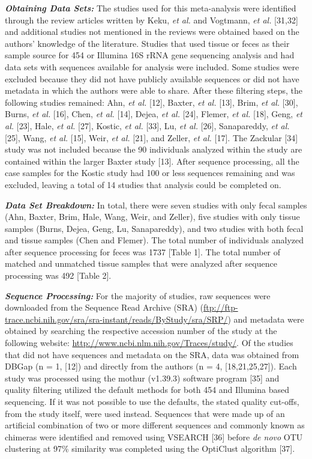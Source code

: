 \documentclass[12pt,]{article}
\begin{document}
\textbf{\emph{Obtaining Data Sets:}} The studies used for this
meta-analysis were identified through the review articles written by
Keku, \emph{et al.} and Vogtmann, \emph{et al.} {[}31,32{]} and
additional studies not mentioned in the reviews were obtained based on
the authors' knowledge of the literature. Studies that used tissue or
feces as their sample source for 454 or Illumina 16S rRNA gene
sequencing analysis and had data sets with sequences available for
analysis were included. Some studies were excluded because they did not
have publicly available sequences or did not have metadata in which the
authors were able to share. After these filtering steps, the following
studies remained: Ahn, \emph{et al.} {[}12{]}, Baxter, \emph{et al.}
{[}13{]}, Brim, \emph{et al.} {[}30{]}, Burns, \emph{et al.} {[}16{]},
Chen, \emph{et al.} {[}14{]}, Dejea, \emph{et al.} {[}24{]}, Flemer,
\emph{et al.} {[}18{]}, Geng, \emph{et al.} {[}23{]}, Hale, \emph{et
al.} {[}27{]}, Kostic, \emph{et al.} {[}33{]}, Lu, \emph{et al.}
{[}26{]}, Sanapareddy, \emph{et al.} {[}25{]}, Wang, \emph{et al.}
{[}15{]}, Weir, \emph{et al.} {[}21{]}, and Zeller, \emph{et al.}
{[}17{]}. The Zackular {[}34{]} study was not included because the 90
individuals analyzed within the study are contained within the larger
Baxter study {[}13{]}. After sequence processing, all the case samples
for the Kostic study had 100 or less sequences remaining and was
excluded, leaving a total of 14 studies that analysis could be completed
on.

\textbf{\emph{Data Set Breakdown:}} In total, there were seven studies
with only fecal samples (Ahn, Baxter, Brim, Hale, Wang, Weir, and
Zeller), five studies with only tissue samples (Burns, Dejea, Geng, Lu,
Sanapareddy), and two studies with both fecal and tissue samples (Chen
and Flemer). The total number of individuals analyzed after sequence
processing for feces was 1737 {[}Table 1{]}. The total number of matched
and unmatched tissue samples that were analyzed after sequence
processing was 492 {[}Table 2{]}.

\textbf{\emph{Sequence Processing:}} For the majority of studies, raw
sequences were downloaded from the Sequence Read Archive (SRA)
(\url{ftp://ftp-trace.ncbi.nih.gov/sra/sra-instant/reads/ByStudy/sra/SRP/})
and metadata were obtained by searching the respective accession number
of the study at the following website:
\url{http://www.ncbi.nlm.nih.gov/Traces/study/}. Of the studies that did
not have sequences and metadata on the SRA, data was obtained from DBGap
(n = 1, {[}12{]}) and directly from the authors (n = 4,
{[}18,21,25,27{]}). Each study was processed using the mothur (v1.39.3)
software program {[}35{]} and quality filtering utilized the default
methods for both 454 and Illumina based sequencing. If it was not
possible to use the defaults, the stated quality cut-offs, from the
study itself, were used instead. Sequences that were made up of an
artificial combination of two or more different sequences and commonly
known as chimeras were identified and removed using VSEARCH {[}36{]}
before \emph{de novo} OTU clustering at 97\% similarity was completed
using the OptiClust algorithm {[}37{]}.
\end{document}
